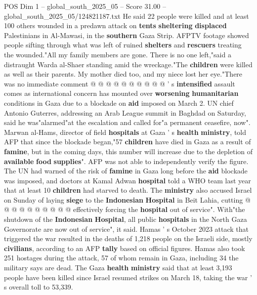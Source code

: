 \begin{textsample}{POS Dim 1 – global\_south\_2025\_05 – Score 31.00 – global\_south\_2025\_05/124821187.txt}
He said 22 people were killed and at least 100 others wounded in a predawn attack on \textbf{tents} \textbf{sheltering} \textbf{displaced} Palestinians in Al-Mawasi, in the \textbf{southern} Gaza Strip.
AFPTV footage showed people sifting through what was left of ruined \textbf{shelters} and \textbf{rescuers} treating the wounded."All my family members are gone.
There is no one left,"said a distraught Warda al-Shaer standing amid the wreckage."The \textbf{children} were killed as well as their parents.
My mother died too, and my niece lost her eye."There was no immediate comment @ @ @ @ @ @ @ @ @ @ ' s \textbf{intensified} assault comes as international concern has mounted over \textbf{worsening} \textbf{humanitarian} conditions in Gaza due to a blockade on \textbf{aid} imposed on March 2.
UN chief Antonio Guterres, addressing an Arab League summit in Baghdad on Saturday, said he was"alarmed"at the escalation and called for"a permanent ceasefire, now".
Marwan al-Hams, director of field \textbf{hospitals} at Gaza ' s \textbf{health} \textbf{ministry}, told AFP that since the blockade began,"57 \textbf{children} have died in Gaza as a result of \textbf{famine}, but in the coming days, this number will increase due to the depletion of \textbf{available} \textbf{food} \textbf{supplies}".
AFP was not able to independently verify the figure.
The UN had warned of the risk of \textbf{famine} in Gaza long before the \textbf{aid} blockade was imposed, and doctors at Kamal Adwan \textbf{hospital} told a WHO team last year that at least 10 \textbf{children} had starved to death.
The \textbf{ministry} also accused Israel on Sunday of laying \textbf{siege} to the \textbf{Indonesian} \textbf{Hospital} in Beit Lahia, cutting @ @ @ @ @ @ @ @ @ @ effectively forcing the \textbf{hospital} out of service".
With"the shutdown of the \textbf{Indonesian} \textbf{Hospital}, all public \textbf{hospitals} in the North Gaza Governorate are now out of service", it said.
Hamas ' s October 2023 attack that triggered the war resulted in the deaths of 1,218 people on the Israeli side, mostly \textbf{civilians}, according to an AFP \textbf{tally} based on official figures.
Hamas also took 251 hostages during the attack, 57 of whom remain in Gaza, including 34 the military says are dead.
The Gaza \textbf{health} \textbf{ministry} said that at least 3,193 people have been killed since Israel resumed strikes on March 18, taking the war ' s overall toll to 53,339.

\end{textsample}
